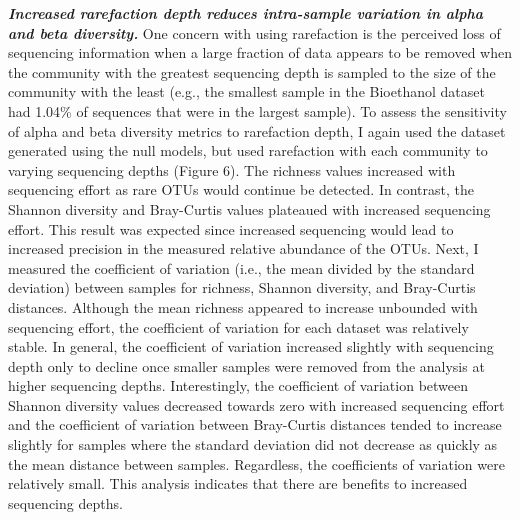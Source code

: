 \documentclass[
]{article}
\begin{document}
\textbf{\emph{Increased rarefaction depth reduces intra-sample variation
in alpha and beta diversity.}} One concern with using rarefaction is the
perceived loss of sequencing information when a large fraction of data
appears to be removed when the community with the greatest sequencing
depth is sampled to the size of the community with the least (e.g., the
smallest sample in the Bioethanol dataset had 1.04\% of sequences that
were in the largest sample). To assess the sensitivity of alpha and beta
diversity metrics to rarefaction depth, I again used the dataset
generated using the null models, but used rarefaction with each
community to varying sequencing depths (Figure 6). The richness values
increased with sequencing effort as rare OTUs would continue be
detected. In contrast, the Shannon diversity and Bray-Curtis values
plateaued with increased sequencing effort. This result was expected
since increased sequencing would lead to increased precision in the
measured relative abundance of the OTUs. Next, I measured the
coefficient of variation (i.e., the mean divided by the standard
deviation) between samples for richness, Shannon diversity, and
Bray-Curtis distances. Although the mean richness appeared to increase
unbounded with sequencing effort, the coefficient of variation for each
dataset was relatively stable. In general, the coefficient of variation
increased slightly with sequencing depth only to decline once smaller
samples were removed from the analysis at higher sequencing depths.
Interestingly, the coefficient of variation between Shannon diversity
values decreased towards zero with increased sequencing effort and the
coefficient of variation between Bray-Curtis distances tended to
increase slightly for samples where the standard deviation did not
decrease as quickly as the mean distance between samples. Regardless,
the coefficients of variation were relatively small. This analysis
indicates that there are benefits to increased sequencing depths.
\end{document}
